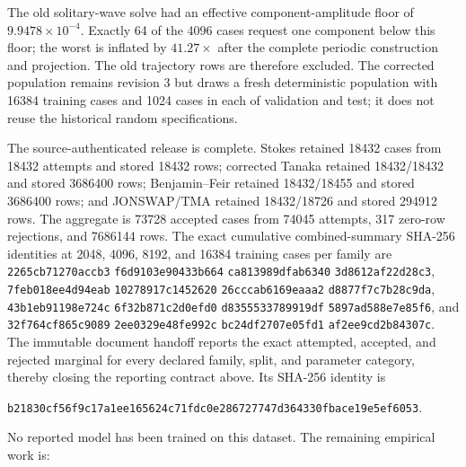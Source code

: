 \documentclass[11pt]{article}
\begin{document}
The old solitary-wave solve had an effective component-amplitude floor of
$9.9478\times10^{-4}$.  Exactly 64 of the 4096 cases request one component
below this floor; the worst is inflated by $41.27\times$ after the complete
periodic construction and projection.  The old trajectory rows are therefore
excluded.  The corrected population remains revision 3 but draws a fresh
deterministic population with 16384 training cases and 1024 cases in each of
validation and test; it does not reuse the historical random specifications.

The source-authenticated release is complete.  Stokes retained 18432 cases
from 18432 attempts and stored 18432 rows; corrected Tanaka retained
18432/18432 and stored 3686400 rows; Benjamin--Feir retained 18432/18455 and
stored 3686400 rows; and JONSWAP/TMA retained 18432/18726 and stored 294912
rows.  The aggregate is 73728 accepted cases from 74045 attempts, 317
zero-row rejections, and 7686144 rows.  The exact cumulative combined-summary
SHA-256 identities at 2048, 4096, 8192, and 16384 training cases per family
are
\texttt{2265cb71270accb3}\allowbreak
\texttt{f6d9103e90433b664}\allowbreak
\texttt{ca813989dfab6340}\allowbreak
\texttt{3d8612af22d28c3},
\texttt{7feb018ee4d94eab}\allowbreak
\texttt{10278917c1452620}\allowbreak
\texttt{26cccab6169eaaa2}\allowbreak
\texttt{d8877f7c7b28c9da},
\texttt{43b1eb91198e724c}\allowbreak
\texttt{6f32b871c2d0efd0}\allowbreak
\texttt{d8355533789919df}\allowbreak
\texttt{5897ad588e7e85f6},
and
\texttt{32f764cf865c9089}\allowbreak
\texttt{2ee0329e48fe992c}\allowbreak
\texttt{bc24df2707e05fd1}\allowbreak
\texttt{af2ee9cd2b84307c}.
The immutable document handoff reports the exact attempted, accepted, and
rejected marginal for every declared family, split, and parameter category,
thereby closing the reporting contract above.  Its SHA-256 identity is
\begin{center}
\small
\texttt{b21830cf56f9c17a1ee165624c71fdc0e286727747d364330fbace19e5ef6053}.
\end{center}
No reported model has been trained on this dataset.  The remaining empirical
work is:
\end{document}
